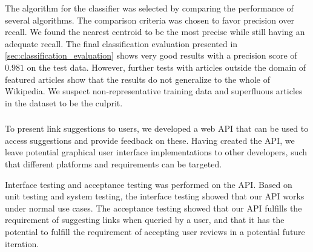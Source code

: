 

The algorithm for the classifier was selected by comparing the performance of several algorithms. The comparison criteria was chosen to favor precision over recall. We found the nearest centroid to be the most precise while still having an adequate recall.
The final classification evaluation presented in \cref{sec:classification_evaluation} shows very good results with a precision score of $0.981$ on the test data. However, further tests with articles outside the domain of featured articles show that the results do not generalize to the whole of Wikipedia. We suspect non-representative training data and superfluous articles in the dataset to be the culprit.


\subsubsection*{\subproblemthree}

To present link suggestions to users, we developed a web API that can be used to access suggestions and provide feedback on these. Having created the API, we leave potential graphical user interface implementations to other developers, such that different platforms and requirements can be targeted.

Interface testing and acceptance testing was performed on the API\@. Based on unit testing and system testing, the interface testing showed that our API works under normal use cases. The acceptance testing showed that our API fulfills the requirement of suggesting links when queried by a user, and that it has the potential to fulfill the requirement of accepting user reviews in a potential future iteration.

